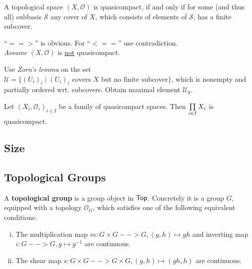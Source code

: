 \begin{theorem}
	A topological space $(X,\mathcal{O})$ is quasicompact, if and only if for some (and thus all) subbasis $\mathcal{S}$ any cover of $X$, which consists of elements of $\mathcal{S}$, has a finite subcover.
\end{theorem}

\begin{sketch}
	\enquote{$==>$} is obvious. For \enquote{$<==$} use contradiction.\\
	\textit{Assume} $(X,\mathcal{O})$ is \underline{not} quasicompact.
	\begin{tab}[1.3cm]
		Use \textit{Zorn's lemma} on the set $\mathcal{U} = \{(U_i)_i \mid (U_i)_i \text{ covers } X \text{ but no finite subcover}\}$, which is nonempty and partially ordered wrt. subcovers. Obtain maximal element $\mathcal{U}_0$. 
	\end{tab}
\end{sketch}

\begin{corollary}
	Let $(X_i, \mathcal{O}_i)_{i\in I}$ be a family of quasicompact spaces. Then $\prod \limits_{i \in I} X_i$ is quasicompact.
\end{corollary}


\subsection{Size}

\subsection{Topological Groups}

\begin{definition}
	A \textbf{topological group} is a group object in $\textsf{Top}$. Concretely it is a group $G$, equipped with a topology $\mathcal{O}_G$, which satisfies one of the following equivalent conditions:
	\begin{enumerate}[(i)]
		\item{
			The multiplication map $m:G \times G --> G, (g,h) \mapsto gh$ and inverting map $i: G --> G, g \mapsto g^{-1}$ are continuous.
		}
		\item{
			The shear map $s: G \times G --> G \times G, (g,h) \mapsto (gh, h)$ are continuous.
		}
	\end{enumerate}
\end{definition}

